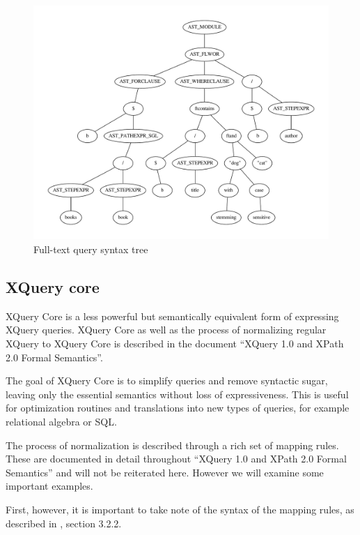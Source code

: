 \begin{figure}[h]
  \centering
    \includegraphics[scale=0.50]{img/graphs/ftq1} 
  \caption{Full-text query syntax tree}
  \label{figure:xquery:full_text_ast}
\end{figure}

\subsection{XQuery core}
\label{sect:theory:xquery:XQcore}
XQuery Core is a less powerful but semantically equivalent form of expressing
XQuery queries. XQuery Core as well as the process of normalizing regular
XQuery to XQuery Core is described in the document ``XQuery 1.0 and XPath 2.0
Formal Semantics''\cite{xquery_semantics}.

The goal of XQuery Core is to simplify queries and remove syntactic sugar,
leaving only the essential semantics without loss of expressiveness.
This is useful for optimization routines and translations into new types of
queries, for example relational algebra or SQL.

The process of normalization is described through a rich set of mapping
rules. These are documented in detail throughout ``XQuery 1.0 and XPath 2.0
Formal Semantics''\cite{xquery_semantics} and will not be reiterated here.
However we will examine some important examples.

First, however, it is important to take note of the syntax of the mapping
rules, as described in \cite{xquery_semantics}, section 3.2.2. 
 
